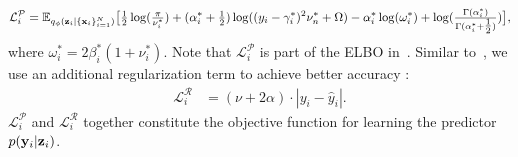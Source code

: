 \def\maketag@@@#1{\hbox{\m@th\normalsize\normalfont#1}}%
\begin{align}
\mathcal{L}_i^{\mathcal{P}} = \mathbb{E}_{q_{\phi}({\bf z}_i|\{{\bf x}_i\}^{N}_{i=1})} \big[\tfrac{1}{2}\log(\tfrac{\pi}{\nu_i^*}) + (\alpha_i^*+\tfrac{1}{2})\log((y_i-\gamma_i^*)^2\nu_n^*+\Omega) - \alpha_i^*\log(\omega_i^*) + \log(\tfrac{\Gamma(\alpha_i^*)}{\Gamma(\alpha_i^*+\tfrac{1}{2})})\big] \label{eq:CDMnll},
\end{align}
\endgroup
%
where $\omega_i^*=2\beta_i^*(1+\nu_i^*)$. Note that $\mathcal{L}_i^{\mathcal{P}}$ is part of the ELBO in~. 
Similar to~\citep{DER}, we use an additional regularization term to achieve better accuracy
:
%
\begin{align*}
\mathcal{L}_{i}^{\mathcal{R}} &= (\nu + 2\alpha)\cdot |y_i - \hat{y}_i|.
\end{align*}
%
$\mathcal{L}_{i}^{\mathcal{P}}$ and $\mathcal{L}_{i}^{\mathcal{R}}$ together constitute the objective function for learning the predictor $p({\bf y}_i|{\bf z}_i)$.
%
